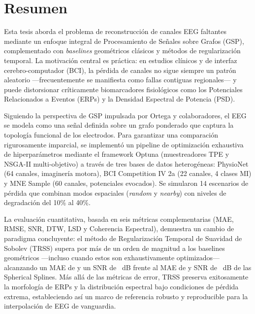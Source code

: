 \chapter*{Resumen}

Esta tesis aborda el problema de reconstrucción de canales EEG faltantes mediante un enfoque integral de Procesamiento de Señales sobre Grafos (GSP), complementado con \textit{baselines} geométricos clásicos y métodos de regularización temporal. La motivación central es práctica: en estudios clínicos y de interfaz cerebro-computador (BCI), la pérdida de canales no sigue siempre un patrón aleatorio ---frecuentemente se manifiesta como fallas contiguas regionales--- y puede distorsionar críticamente biomarcadores fisiológicos como los Potenciales Relacionados a Eventos (ERPs) y la Densidad Espectral de Potencia (PSD).

Siguiendo la perspectiva de GSP impulsada por Ortega y colaboradores, el EEG se modela como una señal definida sobre un grafo ponderado que captura la topología funcional de los electrodos. Para garantizar una comparación rigurosamente imparcial, se implementó un pipeline de optimización exhaustiva de hiperparámetros mediante el framework Optuna (muestreadores TPE y NSGA-II multi-objetivo) a través de tres bases de datos heterogéneas: PhysioNet (64 canales, imaginería motora), BCI Competition IV 2a (22 canales, 4 clases MI) y MNE Sample (60 canales, potenciales evocados). Se simularon 14 escenarios de pérdida que combinan modos espaciales (\textit{random} y \textit{nearby}) con niveles de degradación del 10\% al 40\%.

La evaluación cuantitativa, basada en seis métricas complementarias (MAE, RMSE, SNR, DTW, LSD y Coherencia Espectral), demuestra un cambio de paradigma concluyente: el método de Regularización Temporal de Suavidad de Sobolev (TRSS) supera por más de un orden de magnitud a los baselines geométricos ---incluso cuando estos son exhaustivamente optimizados--- alcanzando un MAE de \ResTVMAE{} y un SNR de \ResTVSNR~dB frente al MAE de \ResBaselineMAE{} y SNR de \ResBaselineSNR~dB de las Spherical Splines. Más allá de las métricas de error, TRSS preserva exitosamente la morfología de ERPs y la distribución espectral bajo condiciones de pérdida extrema, estableciendo así un marco de referencia robusto y reproducible para la interpolación de EEG de vanguardia.
